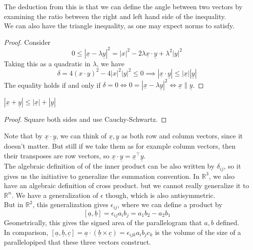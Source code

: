 The deduction from this is that we can define the angle between two vectors by examining the ratio between the right and left hand side of the inequality.\\
We can also have the triangle inequality, as one may expect norms to satisfy.
\begin{proof}
    Consider
    $$0\le|\underline{x}-\lambda\underline{y}|^2=|x|^2-2\lambda\underline{x}\cdot\underline{y}+\lambda^2|y|^2$$
    Taking this as a quadratic in $\lambda$, we have
    $$\delta=4(x\cdot y)^2-4|x|^2|y|^2\le 0\implies|\underline{x}\cdot\underline{y}|\le |\underline{x}||\underline{y}|$$
    The equality holds if and only if $\delta=0\iff 0=|\underline{x}-\lambda\underline{y}|^2\iff\underline{x}\parallel\underline{y}$.
\end{proof}
\begin{theorem}
    $|\underline{x}+\underline{y}|\le|\underline{x}|+|\underline{y}|$
\end{theorem}
\begin{proof}
    Square both sides and use Cauchy-Schwartz.
\end{proof}
Note that by $\underline{x}\cdot\underline{y}$, we can think of $\underline{x},\underline{y}$ as both row and column vectors, since it doesn't matter.
But still if we take them as for example column vectors, then their transposes are row vectors, so $\underline{x}\cdot\underline{y}=\underline{x}^\top\underline{y}$.\\
The algebraic definition of of the inner product can be also written by $\delta_{ij}$, so it gives us the initiative to generalize the summation convention.
In $\mathbb R^3$, we also have an algebraic definition of cross product. but we cannot really generalize it to $\mathbb R^n$.
We have a generalization of $\epsilon$ though, which is also antisymmetric.\\
But in $\mathbb R^2$, this generalization gives $\epsilon_{ij}$, where we can define a product by
$$[\underline{a},\underline{b}]=\epsilon_{ij}a_ib_j=a_1b_2-a_2b_1$$
Geometrically, this gives the signed area of the parallelogram that $a,b$ defined.\\
In comparison, $[\underline{a},\underline{b},\underline{c}]=\underline{a}\cdot(\underline{b}\times\underline{c})=\epsilon_{ijk}a_ib_jc_k$ is the volume of the size of a parallelopiped that these three vectors construct.
